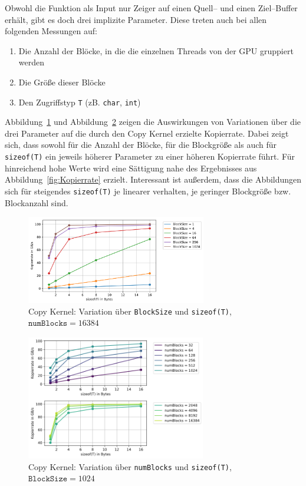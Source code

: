\documentclass[11pt, abstract=on]{scrartcl}
\begin{document}
Obwohl die Funktion als Input nur Zeiger auf einen Quell-- und einen Ziel--Buffer erhält, gibt es doch drei implizite Parameter. Diese treten auch bei allen folgenden Messungen auf:
\begin{enumerate}
	\item Die Anzahl der Blöcke, in die die einzelnen Threads von der GPU gruppiert werden
	\item Die Größe dieser Blöcke
	\item Den Zugriffstyp \texttt{T} (zB. \texttt{char}, \texttt{int})
\end{enumerate}
Abbildung~\ref{fig:CopyKernel1} und Abbildung~\ref{fig:CopyKernelBlocks} zeigen die Auswirkungen von Variationen über die drei Parameter auf die durch den Copy Kernel erzielte Kopierrate. Dabei zeigt sich, dass sowohl für die Anzahl der Blöcke, für die Blockgröße als auch für \texttt{sizeof(T)} ein jeweils höherer Parameter zu einer höheren Kopierrate führt. Für hinreichend hohe Werte wird eine Sättigung nahe des Ergebnisses aus Abbildung~\ref{fig:Kopierrate} erzielt. Interessant ist außerdem, dass die Abbildungen sich für steigendes \texttt{sizeof(T)} je linearer verhalten, je geringer Blockgröße bzw. Blockanzahl sind.

\begin{figure} [htbp]
 	\centering
 		\includegraphics[width=0.7\textwidth]{Graph_CopyKernel1.png}
 	\caption{Copy Kernel: Variation über \texttt{BlockSize} und \texttt{sizeof(T)}, $\texttt{numBlocks} = 16384$}
 	\label{fig:CopyKernel1}
\end{figure}

\begin{figure} [htbp]
 	\centering
 		\includegraphics[width=0.7\textwidth]{Graph_CopyKernelBlocks.png}
 	\caption{Copy Kernel: Variation über \texttt{numBlocks} und \texttt{sizeof(T)}, $\texttt{BlockSize} = 1024$}
 	\label{fig:CopyKernelBlocks}
\end{figure}
\end{document}
